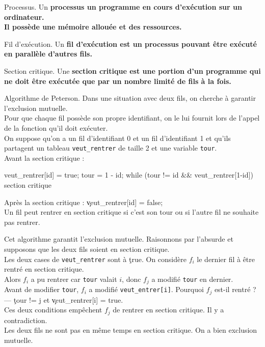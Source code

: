 \documentclass[french, 11pt]{article}
\begin{document}


\begin{defi}{Processus.}{}
    Un \bf{processus} un programme en cours d'exécution sur un ordinateur.\\
    Il possède une mémoire allouée et des ressources.
\end{defi}

\begin{defi}{Fil d'exécution.}{}
    Un \bf{fil d'exécution} est un processus pouvant être exécuté en parallèle d'autres fils.
\end{defi}

\begin{defi}{Section critique.}{}
    Une \bf{section critique} est une portion d'un programme qui ne doit être exécutée que par un nombre limité de fils à la fois.
\end{defi}

\begin{defi}{Algorithme de Peterson.}{}
    Dans une situation avec deux fils, on cherche à garantir l'exclusion mutuelle.\\
    Pour que chaque fil possède son propre identifiant, on le lui fournit lors de l'appel de la fonction qu'il doit exécuter.\\
    On suppose qu'on a un fil d'identifiant 0 et un fil d'identifiant 1 et qu'ils partagent un tableau \texttt{veut\_rentrer} de taille 2 et une variable \texttt{tour}.\\
    Avant la section critique :
    \begin{pygmented}[lang=c, hidealllines=true, linenos=true]
        veut_rentrer[id] = true;
        tour = 1 - id;
        while (tour != id && veut_rentrer[1-id]) {}
        section critique
    \end{pygmented}
    Après la section critique : \c{veut_rentrer[id] = false;}\\
    Un fil peut rentrer en section critique si c'est son tour ou si l'autre fil ne souhaite pas rentrer.
\end{defi}

\vspace*{-0.7cm}

\begin{prop}{}{}
    Cet algorithme garantit l'exclusion mutuelle.
    \tcblower
    Raisonnons par l'absurde et supposons que les deux fils soient en section critique.\\
    Les deux cases de \texttt{veut\_rentrer} sont à \c{true}. On considère $f_i$ le dernier fil à être rentré en section critique.\\
    Alors $f_i$ a pu rentrer car \texttt{tour} valait $i$, donc $f_j$ a modifié \texttt{tour} en dernier.\\
    Avant de modifier \texttt{tour}, $f_i$ a modifié \texttt{veut\_entrer[i]}. Pourquoi $f_j$ est-il rentré ?\\
    --- \c{tour != j} et \c{veut_rentrer[i] = true}.\\
    Ces deux conditions empêchent $f_j$ de rentrer en section critique. Il y a contradiction.\\
    Les deux fils ne sont pas en même temps en section critique. On a bien exclusion mutuelle.
\end{prop}
\end{document}
